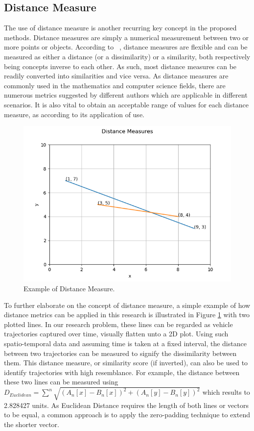 \vspace{1em}
\subsection{Distance Measure}
\label{section:distancemeasures}

The use of distance measure is another recurring key concept in the proposed
methods. Distance measures are simply a numerical measurement between
two or more points or objects. According to ~\cite{mccune2002distance},
distance measures are flexible and can be measured as either a distance (or a dissimilarity)
or a similarity, both respectively being concepts inverse to each other. As such, most distance measures can be readily converted into
similarities and vice versa. 
As distance measures are commonly used in the mathematics and
computer science fields, there are numerous metrics suggested by different
authors which are applicable in different scenarios. It is also
vital to obtain an acceptable range of values for each distance measure, as according to its application of use.

\begin{figure}[hbt!]
 \centering
 \includegraphics[width=.7\textwidth]{image/general/distance.png}
 \caption{Example of Distance Measure.}
 \label{fig:distanceMeasure}
\end{figure}

To further elaborate on the concept of distance measure, a simple
example of how distance metrics can be applied in this research is
illustrated in Figure \ref{fig:distanceMeasure} with two plotted lines.
In our research problem, these lines can be regarded as vehicle
trajectories captured over time, visually flatten unto a 2D plot. Using such spatio-temporal data and assuming time is taken at a fixed interval, the distance between two trajectories can be measured to signify
the dissimilarity between them. This distance measure, or similarity score (if inverted), can also be used to
identify trajectories with high resemblance. For example, the distance between these two lines can be measured using $D_{Euclidean} = \sum^n\sqrt{{(A_n[x] - B_n[x])}^{2} + {(A_n[y] - B_n[y])}^{2}}$ which results to 2.828427 units. As Euclidean Distance requires the length of both lines or vectors to be equal, a common approach is to apply the zero-padding technique to extend the shorter vector.

